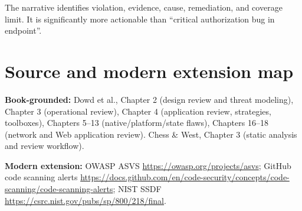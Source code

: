 \documentclass[
  letterpaper,
]{article}
\begin{document}
The narrative identifies violation, evidence, cause, remediation, and
coverage limit. It is significantly more actionable than ``critical
authorization bug in endpoint''.

\section{Source and modern extension
map}\label{source-and-modern-extension-map}

\textbf{Book-grounded:} Dowd et al., Chapter 2 (design review and threat
modeling), Chapter 3 (operational review), Chapter 4 (application
review, strategies, toolboxes), Chapters 5--13 (native/platform/state
flaws), Chapters 16--18 (network and Web application review). Chess \&
West, Chapter 3 (static analysis and review workflow).

\textbf{Modern extension:} OWASP ASVS
\url{https://owasp.org/projects/asvs}; GitHub code scanning alerts
\url{https://docs.github.com/en/code-security/concepts/code-scanning/code-scanning-alerts};
NIST SSDF \url{https://csrc.nist.gov/pubs/sp/800/218/final}.
\end{document}
